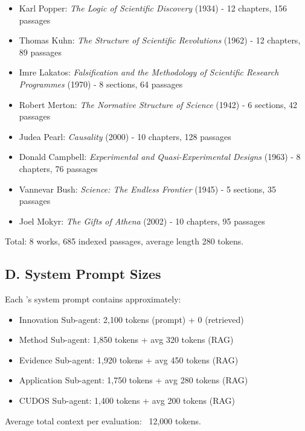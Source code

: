 \begin{itemize}
    \item Karl Popper: \textit{The Logic of Scientific Discovery} (1934) - 12 chapters, 156 passages
    \item Thomas Kuhn: \textit{The Structure of Scientific Revolutions} (1962) - 12 chapters, 89 passages
    \item Imre Lakatos: \textit{Falsification and the Methodology of Scientific Research Programmes} (1970) - 8 sections, 64 passages
    \item Robert Merton: \textit{The Normative Structure of Science} (1942) - 6 sections, 42 passages
    \item Judea Pearl: \textit{Causality} (2000) - 10 chapters, 128 passages
    \item Donald Campbell: \textit{Experimental and Quasi-Experimental Designs} (1963) - 8 chapters, 76 passages
    \item Vannevar Bush: \textit{Science: The Endless Frontier} (1945) - 5 sections, 35 passages
    \item Joel Mokyr: \textit{The Gifts of Athena} (2002) - 10 chapters, 95 passages
\end{itemize}

Total: 8 works, 685 indexed passages, average length 280 tokens.

\subsection{D. System Prompt Sizes}

Each \subagent{}'s system prompt contains approximately:
\begin{itemize}
    \item Innovation Sub-agent: 2,100 tokens (prompt) + 0 (retrieved)
    \item Method Sub-agent: 1,850 tokens + avg 320 tokens (RAG)
    \item Evidence Sub-agent: 1,920 tokens + avg 450 tokens (RAG)
    \item Application Sub-agent: 1,750 tokens + avg 280 tokens (RAG)
    \item CUDOS Sub-agent: 1,400 tokens + avg 200 tokens (RAG)
\end{itemize}

Average total context per evaluation: ~12,000 tokens.
